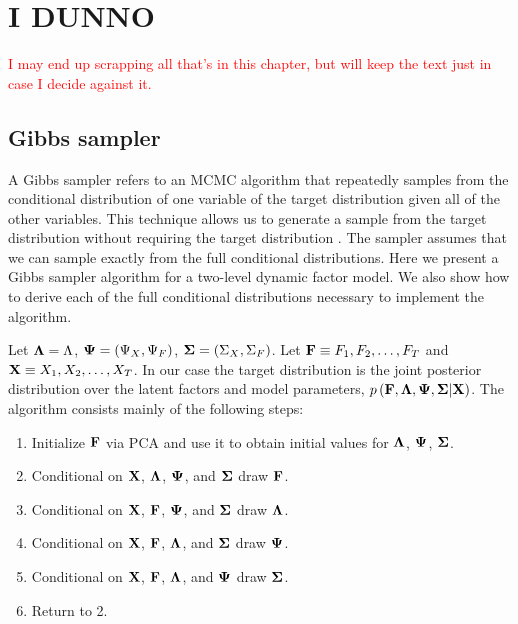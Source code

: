 \clearpage
\chapter{I DUNNO}
\textcolor{red}{I may end up scrapping all that's in this chapter, but will keep the text just in case I decide against it.}

\section{Gibbs sampler}
A Gibbs sampler refers to an MCMC algorithm that repeatedly samples from the conditional distribution of one variable of the target distribution given all of the other variables. This technique allows us to generate a sample from the target distribution without requiring the target distribution \cite{casella1992explaining}. The sampler assumes that we can sample exactly from the full conditional distributions.  Here we present a Gibbs sampler algorithm for a two-level dynamic factor model. We also show how to derive each of the full conditional distributions necessary to implement the algorithm.

 Let ${\bf \Lambda} = \Lambda$, ${\bf \Psi} = \left( \Psi_X, \Psi_F \right)$, ${\bf \Sigma} = \left( \Sigma_X, \Sigma_F \right)$. Let $ {\bf F} \equiv F_{1}, F_{2}, \ldots, F_{T}$ and ${\bf X} \equiv X_{1}, X_{2}, \ldots, X_{T}$. In  our case the target distribution is the joint posterior distribution over the latent factors and  model parameters, $p \left( \bf F, \Lambda, \Psi, \Sigma | X \right)$. The algorithm consists mainly of the following steps:
\begin{enumerate}
	\item Initialize ${\bf F}$ via PCA and use it to obtain initial values for $\bf \Lambda$, $ \bf \Psi$, $\bf \Sigma$.
	\item Conditional on ${\bf X}$, $\bf \Lambda$, $\bf \Psi$, and $\bf \Sigma$ draw ${\bf F}$.
	\item Conditional on ${\bf X}$, ${\bf F}$, $\bf \Psi$, and $\bf \Sigma$ draw $\bf \Lambda$.
	\item Conditional on ${\bf X}$, ${\bf F}$, $\bf \Lambda$, and $\bf \Sigma$ draw $\bf \Psi$.
	\item Conditional on ${\bf X}$, ${\bf F}$, $\bf \Lambda$, and $\bf \Psi$ draw $\bf \Sigma$.
	\item Return to 2.
\end{enumerate}

